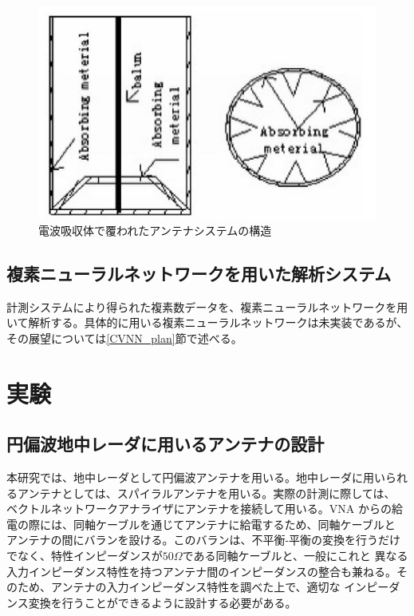 \documentclass[11pt,a4paper,uplatex,draft]{ujarticle}
\begin{document}
    \begin{figure}[hbtp]
      \centering
      \includegraphics[keepaspectratio, width=130mm]{Images/absorbing_material.png}
      \caption{電波吸収体で覆われたアンテナシステムの構造\cite{absorbing_material}}\label{fig:absorbing_material}
    \end{figure}

  \newpage

  \subsection{複素ニューラルネットワークを用いた解析システム}

    計測システムにより得られた複素数データを、複素ニューラルネットワークを用いて解析する。具体的に用いる複素ニューラルネットワークは未実装であるが、
    その展望については\ref{CVNN_plan}節で述べる。

\section{実験}

  \subsection{円偏波地中レーダに用いるアンテナの設計}

  本研究では、地中レーダとして円偏波アンテナを用いる。地中レーダに用いられるアンテナとしては、スパイラルアンテナを用いる。実際の計測に際しては、
  ベクトルネットワークアナライザにアンテナを接続して用いる。VNA からの給電の際には、同軸ケーブルを通じてアンテナに給電するため、同軸ケーブルと
  アンテナの間にバランを設ける。このバランは、不平衡-平衡の変換を行うだけでなく、特性インピーダンスが$50\Omega$である同軸ケーブルと、一般にこれと
  異なる入力インピーダンス特性を持つアンテナ間のインピーダンスの整合も兼ねる。そのため、アンテナの入力インピーダンス特性を調べた上で、適切な
  インピーダンス変換を行うことができるように設計する必要がある。
\end{document}
